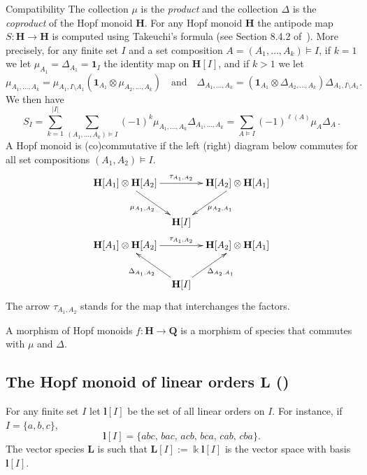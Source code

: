 \documentclass[ALCO,ThmDefs,Unicode,epreuves]{cedram}
\newenvironment{compatibility}{\begin{enonce*}[remark]{Compatibility}}{\end{enonce*}}
\def\Id{\mathbf{1}}
\def\field{\Bbbk}
\newcommand{\rL}{\mathbf{l}}
\newcommand{\bL}{\mathbf{L}}
\newcommand{\bH}{\mathbf{H}}
\begin{document}
\begin{compatibility}
The collection $\mu$ is the \emph{product} and the collection $\Delta$
is the \emph{coproduct} of the Hopf monoid $\bH$. For any Hopf monoid $\bH$ the antipode map $S\colon \bH\to\bH$ is computed using Takeuchi's formula (see Section 8.4.2 of~\cite{AM:2010}). More precisely, for any finite set $I$ and a set composition $A=(A_1,\ldots,A_k)\models I$, if $k=1$ we let $\mu_{A_1}=\Delta_{A_1}=\Id_I$ the identity map on $\bH[I]$, and if $k>1$ we let
 $$ \mu_{A_1,\ldots,A_k} = \mu_{A_1,I\setminus A_1}(\Id_{A_1}\otimes\mu_{A_2,\ldots,A_k})\quad\text{and}\quad
 \Delta_{A_1,\ldots,A_k} =(\Id_{A_1}\otimes\Delta_{A_2,\ldots,A_k}) \Delta_{A_1,I\setminus A_1}.
 $$
We then have
\begin{equation}\label{eq:takeuchi}
 S_I = \sum_{k=1}^{|I|}\sum_{(A_1,\ldots,A_k)\models I} (-1)^{k} \mu_{A_1,\ldots,A_k} \Delta_{A_1,\ldots,A_k}
 = \sum_{A\models I} (-1)^{\ell(A)} \mu_A \Delta_A\,.
\end{equation}
A Hopf monoid is (co)commutative if the left (right) diagram below commutes
for all set compositions $(A_1,A_2)\models I$.
\begin{equation}\label{e:comm}
\begin{gathered}
\xymatrix@C-15pt{
\bH[A_1]\otimes\bH[A_2] \ar[rr]^-{\tau_{A_1,A_2}} \ar[rd]_{\mu_{A_1,A_2}} & & \bH[A_2]\otimes\bH[A_1] \ar[ld]^{\mu_{A_2,A_1}} \\
& \bH[I] &
}
\\
\xymatrix@C-15pt{
\bH[A_1]\otimes\bH[A_2] \ar[rr]^-{\tau_{A_1,A_2}} & &\bH[A_2]\otimes\bH[A_1] \\
& \bH[I] \ar[lu]^{\Delta_{A_1,A_2}} \ar[ru]_{\Delta_{A_2,A_1}} &
}
\end{gathered}
\end{equation}
The arrow $\tau_{A_1,A_2}$ stands for
the map that interchanges the factors.

A morphism of Hopf monoids $f:\bH\to\mathbf{Q}$ is a morphism of species that
commutes with $\mu$ and $\Delta$.
\end{compatibility}


\subsection{The Hopf monoid of linear orders \texorpdfstring{$\bL$ (\cite{AM:2010})}{L ([4])}}\label{ss:order}

For any finite set $I$ let
$\rL[I]$ be the set of all linear orders on $I$. For instance, if $I=\{a,b,c\}$,
\[
\rL[I]=\{abc,\,bac,\,acb,\,bca,\,cab,\,cba\}.
\]
The vector species $\bL$ is such that $\bL[I]:=\field\rL[I]$ is the vector space with basis $\rL[I]$. 
\end{document}

